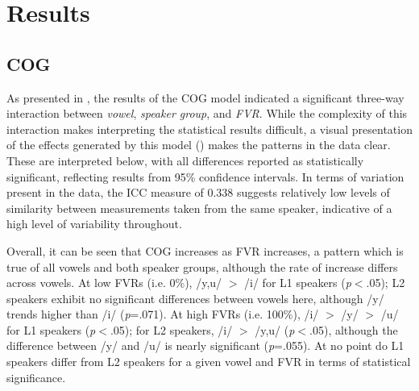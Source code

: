 \documentclass[output=paper,colorlinks,citecolor=brown,draftmode]{langscibook}
\begin{document}
\section{Results}





\subsection{COG}


As presented in , the results of the COG model indicated a significant three-way interaction between \emph{vowel}, \emph{speaker group}, and \emph{FVR}. While the complexity of this interaction makes interpreting the statistical results difficult, a visual presentation of the effects generated by this model () makes the patterns in the data clear. These are interpreted below, with all differences reported as statistically significant, reflecting results from 95\% confidence intervals. In terms of variation present in the data, the ICC measure of 0.338 suggests relatively low levels of similarity between measurements taken from the same speaker, indicative of a high level of variability throughout.



Overall, it can be seen that COG increases as FVR increases, a pattern which is true of all vowels and both speaker groups, although the rate of increase differs across vowels.  At low FVRs (i.e. 0\%), /y,u/ $>$ /i/ for L1 speakers (\emph{p}$<$.05); L2 speakers exhibit no significant differences between vowels here, although /y/ trends higher than /i/ (\emph{p}=.071).  At high FVRs (i.e. 100\%), /i/ $>$ /y/ $>$ /u/ for L1 speakers (\emph{p}$<$.05); for L2 speakers, /i/ $>$ /y,u/ (\emph{p}$<$.05), although the difference between /y/ and /u/ is nearly significant (\emph{p}=.055).  At no point do L1 speakers differ from L2 speakers for a given vowel and FVR in terms of statistical significance.
\end{document}
